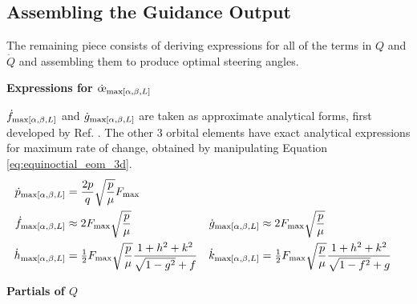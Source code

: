 \subsection{Assembling the Guidance Output}
The remaining piece consists of deriving expressions for all of the terms in $Q$ and $\dot{Q}$ and assembling them to produce optimal steering angles.

\textbf{Expressions for $\dot{\moe}_{\maxrocall}$}

$\dot{f}_{\text{max}[\alpha, \beta, L]}$ and $\dot{g}_{\text{max}[\alpha, \beta, L]}$ are taken as approximate analytical forms, first developed by Ref. \cite{vargaperez2016}. The other 3 orbital elements have exact analytical expressions for maximum rate of change, obtained by manipulating Equation \ref{eq:equinoctial_eom_3d}.
\begin{align*}
     \dot{p}_{\text{max}[\alpha, \beta, L]} &= \frac{2p}{q} \sqrt{\frac{p}{\mu}} F_{\max}\\
     \dot{f}_{\text{max}[\alpha, \beta, L]} & \approx 2F_{\max} \sqrt{\frac{p}{\mu}} &
     \dot{g}_{\text{max}[\alpha, \beta, L]} & \approx 2F_{\max} \sqrt{\frac{p}{\mu}}\\
     \dot{h}_{\text{max}[\alpha, \beta, L]} &= \tfrac{1}{2}F_{\max} \sqrt{\frac{p}{\mu}} \frac{1+h^2+k^2}{\sqrt{1-g^2}+f} & 
     \dot{k}_{\text{max}[\alpha, \beta, L]} &= \tfrac{1}{2}F_{\max} \sqrt{\frac{p}{\mu}}\frac{1+h^2+k^2}{\sqrt{1-f^2}+g}
\end{align*}

\textbf{Partials of $Q$}

